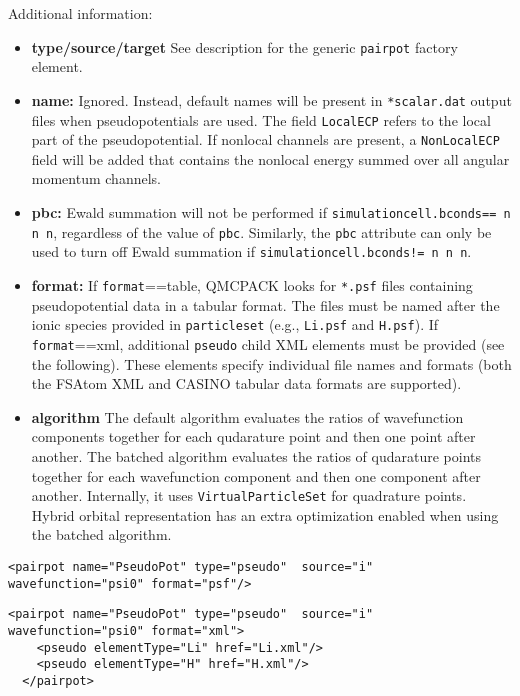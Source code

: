 Additional information:
\begin{itemize}
  \item{\textbf{type/source/target} See description for the generic \texttt{pairpot} factory element.}
  \item{\textbf{name:} Ignored.  Instead, default names will be present in \texttt{*scalar.dat} output files when pseudopotentials are used.  The field \texttt{LocalECP} refers to the local part of the pseudopotential.  If nonlocal channels are present, a \texttt{NonLocalECP} field will be added that contains the nonlocal energy summed over all angular momentum channels.}
  \item{\textbf{pbc:} Ewald summation will not be performed if \texttt{simulationcell.bconds== n n n}, regardless of the value of \texttt{pbc}.  Similarly, the \texttt{pbc} attribute can only be used to turn off Ewald summation if \texttt{simulationcell.bconds!= n n n}.}
  \item{\textbf{format:}  If \texttt{format}==table, QMCPACK looks for \texttt{*.psf} files containing pseudopotential data in a tabular format.  The files must be named after the ionic species provided in \texttt{particleset} (e.g., \texttt{Li.psf} and \texttt{H.psf}). If \texttt{format}==xml, additional \texttt{pseudo} child XML elements must be provided (see the following).  These elements specify individual file names and formats (both the FSAtom XML and CASINO tabular data formats are supported). }
  \item{\textbf{algorithm} The default algorithm evaluates the ratios of wavefunction components together for each qudarature point and then one point after another. The batched algorithm evaluates the ratios of qudarature points together for each wavefunction component and then one component after another. Internally, it uses \texttt{VirtualParticleSet} for quadrature points. Hybrid orbital representation has an extra optimization enabled when using the batched algorithm.}
\end{itemize}


\begin{lstlisting}[style=QMCPXML,caption=QMCPXML element for pseudopotential electron-ion interaction (psf files).]
  <pairpot name="PseudoPot" type="pseudo"  source="i" wavefunction="psi0" format="psf"/>
\end{lstlisting}

\begin{lstlisting}[style=QMCPXML,caption=QMCPXML element for pseudopotential electron-ion interaction (xml files).]
  <pairpot name="PseudoPot" type="pseudo"  source="i" wavefunction="psi0" format="xml">
    <pseudo elementType="Li" href="Li.xml"/>
    <pseudo elementType="H" href="H.xml"/>
  </pairpot>
\end{lstlisting}

